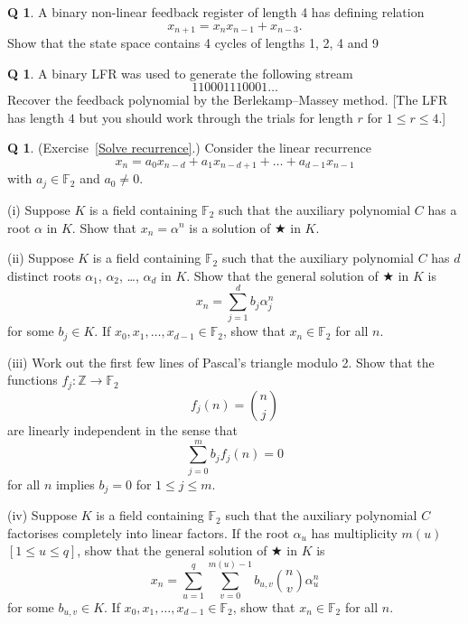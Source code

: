 \documentclass[12pt,a4paper]{article}
\theoremstyle{plain}
\theoremstyle{definition}
\newtheorem{question}[theorem]{Q}
\begin{document}
\begin{question}\label{C4.2}
A binary non-linear feedback register of length 4
has defining relation
\[x_{n+1}=x_{n}x_{n-1}+x_{n-3}.\]
Show that the state space contains 4 cycles of lengths
1, 2, 4 and 9
\end{question}
\begin{question}\label{C4.3}
A binary LFR was used to generate
the following stream
\[110001110001\dots\]
Recover the feedback polynomial by the Berlekamp--Massey
method. [The  LFR has length $4$ but you should work through
the trials for length $r$ for $1\leq r\leq 4$.]
\end{question}
\begin{question}\label{C4.4}
(Exercise~\ref{Solve recurrence}.)
Consider the linear recurrence
\begin{equation*}
x_{n}=a_{0}x_{n-d}+a_{1}x_{n-d+1}+\ldots+a_{d-1}x_{n-1}\tag*{$\bigstar$}
\end{equation*}
with $a_{j}\in {\mathbb F}_{2}$ and $a_{0}\neq 0$.

(i) Suppose $K$ is a field containing ${\mathbb F}_{2}$
such that the auxiliary polynomial $C$ has a root $\alpha$
in $K$. Show that $x_{n}=\alpha^{n}$ is a solution of $\bigstar$ in $K$.

(ii) Suppose $K$ is a field containing ${\mathbb F}_{2}$
such that the auxiliary polynomial $C$ has
$d$ distinct roots $\alpha_{1}$, $\alpha_{2}$,
\dots, $\alpha_{d}$ in $K$. Show that the general solution
of $\bigstar$ in $K$ is
\[x_{n}=\sum_{j=1}^{d}b_{j}\alpha_{j}^{n}\]
for some $b_{j}\in K$.
If $x_{0},x_{1},\dots,x_{d-1}\in {\mathbb F}_{2}$,
show that $x_{n}\in {\mathbb F}_{2}$ for all $n$.

(iii) Work out the first few lines of Pascal's triangle
modulo 2. Show that the functions
$f_{j}:{\mathbb Z}\rightarrow{\mathbb F}_{2}$
\[f_{j}(n)=\binom{n}{j}\]
are linearly independent in the sense that
\[\sum_{j=0}^{m}b_{j}f_{j}(n)=0\]
for all $n$ implies $b_{j}=0$ for $1\leq j\leq m$.

(iv) Suppose $K$ is a field containing ${\mathbb F}_{2}$
such that the auxiliary polynomial $C$ factorises
completely into linear factors. If the
root $\alpha_{u}$ has multiplicity $m(u)$ $[1\leq u\leq q]$,
show that the general solution
of $\bigstar$ in $K$ is
\[x_{n}=\sum_{u=1}^{q}\sum_{v=0}^{m(u)-1}
b_{u,v}\binom{n}{v}\alpha_{u}^{n}\]
for some $b_{u,v}\in K$.
If $x_{0},x_{1},\dots,x_{d-1}\in {\mathbb F}_{2}$,
show that $x_{n}\in {\mathbb F}_{2}$ for all $n$.
\end{question}
\end{document}
